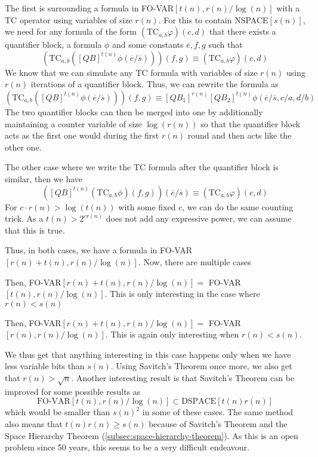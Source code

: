 The first is surrounding a formula in FO-VAR$[t(n), r(n)/\log(n)]$ with a TC operator using variables of size $r(n)$.
For this to contain NSPACE$[s(n)]$, we need for any formula of the form $(\text{TC}_{a, b}\varphi)(c, d)$ that there exists a quantifier block, a formula $\phi$ and some constants $\overline{e}, f, g$ such that
\[
    \left(\text{TC}_{a, b}\left([QB]^{t(n)}\phi(\overline{e}/\overline{s})\right)\right)(f, g) \equiv (\text{TC}_{a, b}\varphi)(c, d)
\]
We know that we can simulate any TC formula with variables of size $r(n)$ using $r(n)$ iterations of a quantifier block.
Thus, we can rewrite the formula as
\[
    \left(\text{TC}_{a, b}\left([QB]^{t(n)}\phi(\overline{e}/\overline{s})\right)\right)(f, g) \equiv [QB_1]^{r(n)}[QB_2]^{t(n)}\phi(\overline{e}/\overline{s}, c/a, d/b)
\]
The two quantifier blocks can then be merged into one by additionally maintaining a counter variable of size $\log(r(n))$ so that the quantifier block acts as the first one would during the first $r(n)$ round and then acts like the other one.

The other case where we write the TC formula after the quantifier block is similar, then we have
\[
    \left([QB]^{t(n)}\left(\text{TC}_{a, b}\phi\right)(f, g)\right)(\overline{e}/\overline{s}) \equiv (\text{TC}_{a, b}\varphi)(c, d)
\]
For $c \cdot r(n) > \log(t(n))$ with some fixed $c$, we can do the same counting trick.
As a $t(n) > 2^{cr(n)}$ does not add any expressive power, we can assume that this is true.

Thus, in both cases, we have a formula in FO-VAR$[r(n) + t(n), r(n)/\log(n)]$.
Now, there are multiple cases
\begin{description}
    \setlength\itemsep{0.2em}
    \item[$r(n) \leq t(n)$]  Then, FO-VAR$[r(n) + t(n), r(n)/\log(n)] =$ FO-VAR$[t(n), r(n)/\log(n)]$.
    This is only interesting in the case where $r(n) < s(n)$
    \item[$r(n) > t(n)$] Then, FO-VAR$[r(n) + t(n), r(n)/\log(n)] =$ FO-VAR$[r(n), r(n)/\log(n)]$.
    This is again only interesting when $r(n) < s(n)$.
\end{description}

We thus get that anything interesting in this case happens only when we have less variable bits than $s(n)$.
Using Savitch's Theorem once more, we also get that $r(n) > \sqrt{n}$.
Another interesting result is that Savitch's Theorem can be improved for some possible results as
\[
    \text{FO-VAR}[t(n), r(n)/\log(n)] \subset \text{DSPACE}[t(n)r(n)]
\]
which would be smaller than $s(n)^2$ in some of these cases.
The same method also means that $t(n)r(n) \geq s(n)$ because of Savitch's Theorem and the Space Hierarchy Theorem (\cref{subsec:space-hierarchy-theorem}).
As this is an open problem since 50 years, this seems to be a very difficult endeavour.

